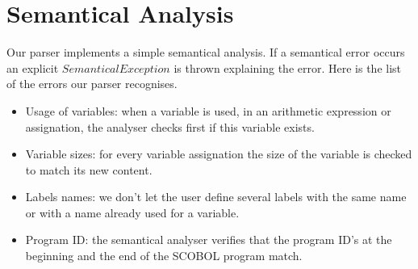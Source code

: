 \newpage\cleardoublepage{}
\section{Semantical Analysis}

Our parser implements a simple semantical analysis. If a semantical error occurs an explicit $SemanticalException$ is thrown explaining the error. Here is the list of the errors our parser recognises.

\begin{itemize}

\item Usage of variables: when a variable is used, in an arithmetic expression or assignation, the analyser checks first if this variable exists.
\item Variable sizes: for every variable assignation the size of the variable is checked to match its new content.
\item Labels names: we don't let the user define several labels with the same name or with a name already used for a variable.
\item Program ID: the semantical analyser verifies that the program ID's at the beginning and the end of the SCOBOL program match.


\end {itemize}


